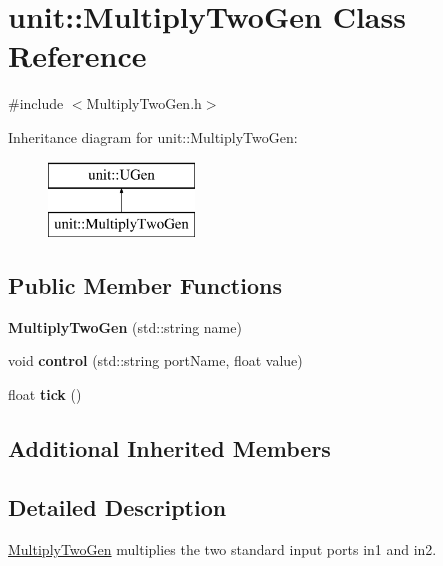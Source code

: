 \hypertarget{classunit_1_1MultiplyTwoGen}{\section{unit\-:\-:Multiply\-Two\-Gen Class Reference}
\label{classunit_1_1MultiplyTwoGen}
}


{\ttfamily \#include $<$Multiply\-Two\-Gen.\-h$>$}

Inheritance diagram for unit\-:\-:Multiply\-Two\-Gen\-:\begin{figure}[H]
\begin{center}
\leavevmode
\includegraphics[height=2.000000cm]{classunit_1_1MultiplyTwoGen}
\end{center}
\end{figure}
\subsection*{Public Member Functions}
\begin{DoxyCompactItemize}
\item 
\hypertarget{classunit_1_1MultiplyTwoGen_a35e526170e8ac7a43fc19c2a78e14b44}{{\bfseries Multiply\-Two\-Gen} (std\-::string name)}\label{classunit_1_1MultiplyTwoGen_a35e526170e8ac7a43fc19c2a78e14b44}

\item 
\hypertarget{classunit_1_1MultiplyTwoGen_af8558651a63c73f27221e99ad03f3242}{void {\bfseries control} (std\-::string port\-Name, float value)}\label{classunit_1_1MultiplyTwoGen_af8558651a63c73f27221e99ad03f3242}

\item 
\hypertarget{classunit_1_1MultiplyTwoGen_a70a07ad9e0f67e6a50aadcdf902db8f3}{float {\bfseries tick} ()}\label{classunit_1_1MultiplyTwoGen_a70a07ad9e0f67e6a50aadcdf902db8f3}

\end{DoxyCompactItemize}
\subsection*{Additional Inherited Members}


\subsection{Detailed Description}
\hyperlink{classunit_1_1MultiplyTwoGen}{Multiply\-Two\-Gen} multiplies the two standard input ports in1 and in2.

